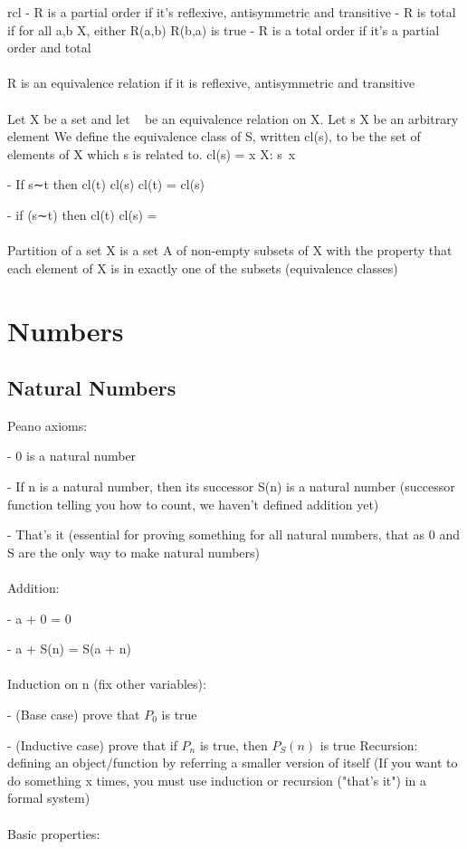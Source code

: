 \documentclass{article}
\begin{document}
\begin{arrary}{rcl}
- R is a partial order if it's reflexive, antisymmetric and transitive
- R is total if for all \math a,b \in X\), either \math R(a,b) \vee R(b,a)\) is true
- R is a total order if it's a partial order and total
\\
\\
R is an equivalence relation if it is reflexive, antisymmetric and transitive
\\
\\
Let X be a set and let ~ be an equivalence relation on X. Let s \in\) X be an arbitrary element We define the equivalence class of S, written cl(s), to be the set of elements of X which s is related to. \math cl(s) = {x \in X: s~x}\)

- If s∼t then \math cl(t) \subset cl(s) \Rightarrow cl(t) = cl(s)\)

- if \neg (s∼t)\) then \math cl(t) \cap cl(s) = \emptyset\)
\\
\\
Partition of a set X is a set A of non-empty subsets of X with the property that each element of X is in exactly one of the subsets (equivalence classes)

\section{Numbers}

\subsection{Natural Numbers}

Peano axioms:

- 0 is a natural number

- If n is a natural number, then its successor S(n) is a natural number (successor function telling you how to count, we haven't defined addition yet)

- That's it (essential for proving something for all natural numbers, that as 0 and S are the only way to make natural numbers)
\\
\\
Addition:

- \math a + 0 = 0\)

- \math a + S(n) = S(a + n)\)
\\
\\
Induction on n (fix other variables):

- (Base case) prove that $P_0$ is true

- (Inductive case) prove that if $P_n$ is true, then $P_S(n)$ is true
\newline Recursion: defining an object/function by referring a smaller version of itself
\newline (If you want to do something x times, you must use induction or recursion ("that's it") in a formal system)
\\
\\
Basic properties:


\end{arrary}
\end{document}
